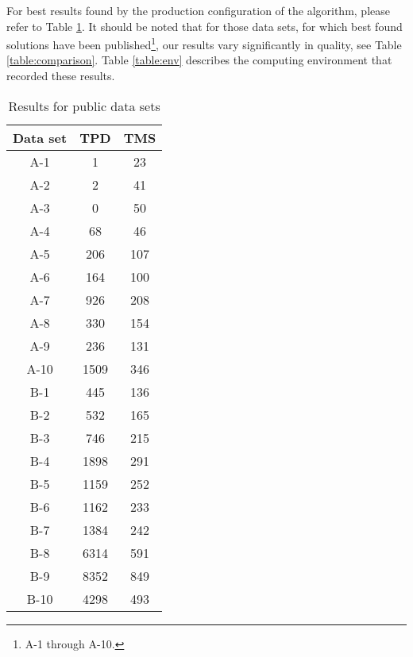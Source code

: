 \documentclass[10pt,a4paper]{article}
\begin{document}
For best results found by the production configuration of the algorithm, please refer to Table \ref{table:results}. It should be noted that for those data sets, for which best found solutions have been published\footnote{A-1 through A-10.}, our results vary significantly in quality, see Table \ref{table:comparison}. Table \ref{table:env} describes the computing environment that recorded these results.

\begin{table}
\caption{Results for public data sets}
\centering
\begin{tabular}{c||c|c}
Data set & TPD & TMS \\ 
\hline 
\hline 
A-1 & 1 & 23 \\ 
\hline 
A-2 & 2 & 41 \\ 
\hline 
A-3 & 0 & 50 \\ 
\hline 
A-4 & 68 & 46 \\ 
\hline 
A-5 & 206 & 107 \\ 
\hline 
A-6 & 164 & 100 \\ 
\hline 
A-7 & 926 & 208 \\ 
\hline 
A-8 & 330 & 154 \\ 
\hline 
A-9 & 236 & 131 \\ 
\hline 
A-10 & 1509 & 346\\ 
\hline 
B-1 & 445 & 136\\ 
\hline 
B-2 & 532 & 165\\ 
\hline 
B-3 & 746 & 215\\ 
\hline 
B-4 & 1898 & 291\\ 
\hline 
B-5 & 1159 & 252\\ 
\hline 
B-6 & 1162 & 233\\ 
\hline 
B-7 & 1384 & 242\\
\hline 
B-8 & 6314 & 591\\ 
\hline 
B-9 & 8352 & 849\\ 
\hline 
B-10 & 4298 & 493\\ 
\end{tabular} 
\label{table:results}
\end{table}
\end{document}
